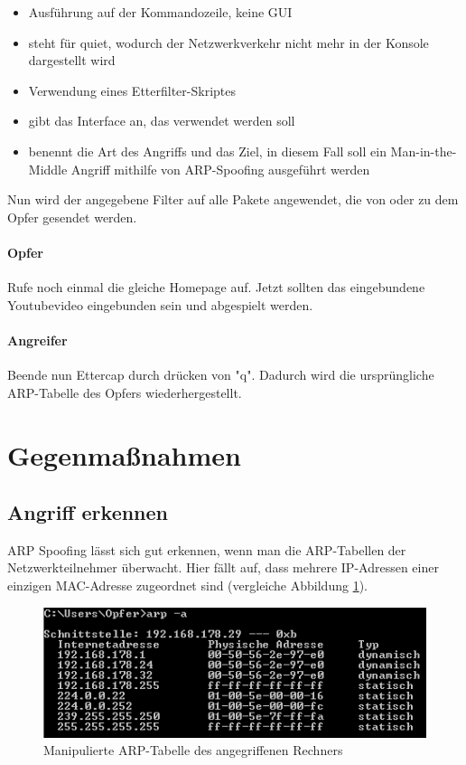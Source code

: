 \begin{itemize}
	\item {} Ausführung auf der Kommandozeile, keine GUI
	\item {} steht für quiet, wodurch der Netzwerkverkehr nicht mehr in der Konsole dargestellt wird
	\item {} Verwendung eines Etterfilter-Skriptes
	\item {} gibt das Interface an, das verwendet werden soll
	\item {} benennt die Art des Angriffs und das Ziel, in diesem Fall soll ein Man-in-the-Middle Angriff mithilfe von ARP-Spoofing ausgeführt werden
\end{itemize}

Nun wird der angegebene Filter auf alle Pakete angewendet, die von oder zu dem Opfer gesendet werden.

\paragraph{Opfer} Rufe noch einmal die gleiche Homepage auf. Jetzt sollten das eingebundene Youtubevideo eingebunden sein und abgespielt werden.

\paragraph{Angreifer} Beende nun Ettercap durch drücken von "q". Dadurch wird die ursprüngliche ARP-Tabelle des Opfers wiederhergestellt.

\section{Gegenmaßnahmen}

\subsection{Angriff erkennen}
ARP Spoofing lässt sich gut erkennen, wenn man die ARP-Tabellen der Netzwerkteilnehmer überwacht. Hier fällt auf, dass mehrere IP-Adressen einer einzigen MAC-Adresse zugeordnet sind (vergleiche Abbildung \ref{fig:arp_tabelle_nachher}).

\begin{figure}
	\centering
	\includegraphics[width=\textwidth]{images/ARP_Spoofing/ARP_Tabelle_Nachher}
	\caption{Manipulierte ARP-Tabelle des angegriffenen Rechners}
	\label{fig:arp_tabelle_nachher}
\end{figure}

